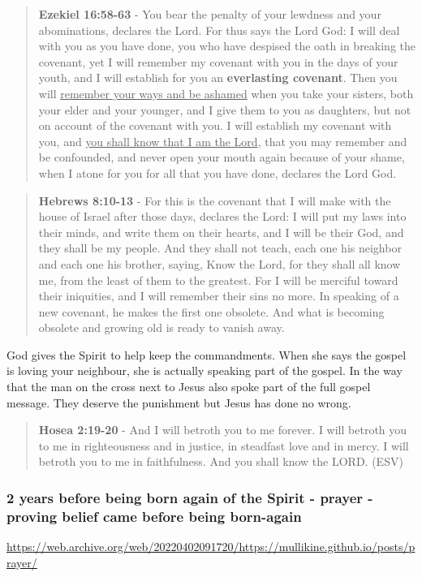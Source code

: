 \documentclass[11pt]{article}
\begin{document}
\begin{quote}
\textbf{Ezekiel 16:58-63} - You bear the penalty of your lewdness and your abominations, declares the Lord.  For thus says the Lord God: I will deal with you as you have done, you who have despised the oath in breaking the covenant, yet I will remember my covenant with you in the days of your youth, and I will establish for you an \textbf{everlasting covenant}.  Then you will \uline{remember your ways and be ashamed} when you take your sisters, both your elder and your younger, and I give them to you as daughters, but not on account of the covenant with you.  I will establish my covenant with you, and \uline{you shall know that I am the Lord}, that you may remember and be confounded, and never open your mouth again because of your shame, when I atone for you for all that you have done, declares the Lord God.
\end{quote}

\begin{quote}
\textbf{Hebrews 8:10-13} - For this is the covenant that I will make with the house of Israel after those days, declares the Lord: I will put my laws into their minds, and write them on their hearts, and I will be their God, and they shall be my people. And they shall not teach, each one his neighbor and each one his brother, saying, Know the Lord, for they shall all know me, from the least of them to the greatest. For I will be merciful toward their iniquities, and I will remember their sins no more. In speaking of a new covenant, he makes the first one obsolete. And what is becoming obsolete and growing old is ready to vanish away.
\end{quote}

God gives the Spirit to help keep the commandments. When she says the gospel is loving your neighbour, she is actually speaking part of the gospel. In the way that the man on the cross next to Jesus also spoke part of the full gospel message. They deserve the punishment but Jesus has done no wrong.

\begin{quote}
\textbf{Hosea 2:19-20} - And I will betroth you to me forever. I will betroth you to me in righteousness and in justice, in steadfast love and in mercy. I will betroth you to me in faithfulness. And you shall know the LORD. (ESV)
\end{quote}

\subsubsection{2 years before being born again of the Spirit - prayer - proving belief came before being born-again}
\label{sec:orge5e996c}
\url{https://web.archive.org/web/20220402091720/https://mullikine.github.io/posts/prayer/}
\end{document}
